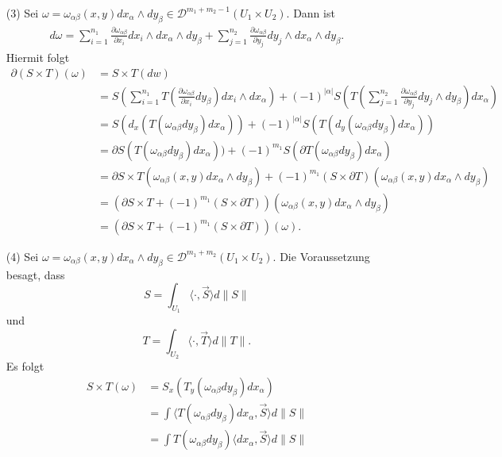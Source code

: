\documentclass[a4paper,twoside,DIV15,BCOR12mm]{scrbook}
\newcommand{\overarrow}{\overrightarrow}
\begin{document}
\begin{beweis}
\begin{enumerate}
\item[(3)] Sei $\omega = \omega_{\alpha\beta}(x,y) dx_\alpha\wedge dy_\beta \in \mathcal D^{m_1+m_2-1}(U_1\times U_2)$. Dann ist
\begin{align*}
d\omega = \sum_{i=1}^{n_1} \frac{\partial \omega_{\alpha\beta}}{\partial x_i} dx_i \wedge dx_\alpha\wedge  dy_\beta + \sum_{j=1}^{n_2}  \frac{\partial \omega_{\alpha\beta}}{\partial y_j} dy_j \wedge dx_\alpha\wedge dy_\beta.
\end{align*}
Hiermit folgt
\begin{align*}
\partial(S\times T)(\omega) &= S\times T(dw) \\
&= S(\sum_{i=1}^{n_1} T(\frac{\partial \omega_{\alpha\beta}}{\partial x_i} dy_\beta) dx_i \wedge dx_\alpha) + (-1)^{|\alpha|} S(T(\sum_{j=1}^{n_2} \frac{\partial \omega_{\alpha\beta}}{\partial y_j} dy_j \wedge dy_\beta) dx_\alpha)\\
&= S(d_x (T(\omega_{\alpha\beta} dy_\beta) dx_\alpha)) + (-1)^{|\alpha|} S(T(d_y (\omega_{\alpha\beta} dy_\beta) dx_\alpha))\\
&= \partial S(T(\omega_{\alpha\beta} dy_\beta)dx_\alpha)) + (-1)^{m_1} S(\partial T(\omega_{\alpha\beta} dy_\beta) dx_\alpha) \\
&= \partial S \times T (\omega_{\alpha\beta}(x,y) dx_\alpha\wedge dy_\beta) + (-1)^{m_1} (S\times \partial T) (\omega_{\alpha\beta}(x,y)d x_\alpha\wedge dy_\beta)\\
&= (\partial S \times T  + (-1)^{m_1} (S\times \partial T)) (\omega_{\alpha\beta}(x,y)d x_\alpha\wedge dy_\beta)\\
&= (\partial S \times T  + (-1)^{m_1} (S\times \partial T)) (\omega).
\end{align*}
\item[(4)] Sei $\omega = \omega_{\alpha\beta}(x,y) dx_\alpha\wedge dy_\beta \in \mathcal D^{m_1+m_2} (U_1\times U_2)$. Die Voraussetzung besagt, dass 
\[
S= \int_{U_1}\langle \cdot, \overarrow S\rangle d\|S\|
\]
und
\[
T=\int_{U_2}\langle \cdot, \overarrow T\rangle d\|T\|.
\]
Es folgt
\begin{align*}
S\times T (\omega) &= S_x(T_y(\omega_{\alpha\beta} dy_\beta) dx_\alpha) \\
&= \int \langle T(\omega_{\alpha\beta}dy_\beta) dx_\alpha, \overarrow S \rangle d\|S\| \\
&= \int T(\omega_{\alpha\beta} dy_\beta) \langle dx_\alpha, \overarrow S \rangle d\|S\| \\

\end{align*}
\end{enumerate}
\end{beweis}
\end{document}
